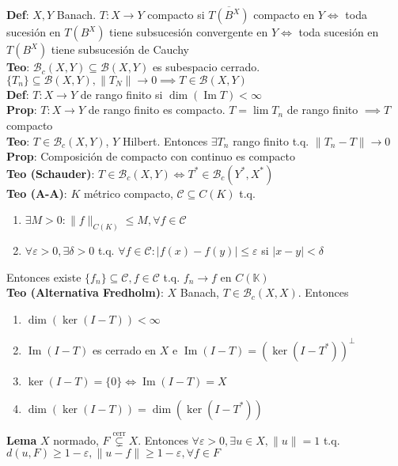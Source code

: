 \documentclass[9pt]{extarticle}
\newcommand{\K}{\mathbb{K}}
\begin{document}
\begin{multicols*}{2}
\begin{enumerate}
\end{enumerate}
\textbf{Def}: $X,Y$ Banach. $T:X\to Y$ compacto si $\overline{T(B^X)}$ compacto en $Y\iff$ toda sucesión en $T(B^X)$ tiene subsucesión convergente en $Y\iff$ toda sucesión en $T(B^X)$ tiene subsucesión de Cauchy\\
\textbf{Teo}: $\mathcal{B}_c(X,Y)\subseteq \mathcal{B}(X,Y)$ es subespacio cerrado. $\{T_n\}\subseteq \mathcal{B}(X,Y), \|T_N\|\to 0\implies T\in\mathcal{B}(X,Y)$\\
\textbf{Def}: $T:X\to Y$ de rango finito si $\operatorname{dim}(\operatorname{Im} T)<\infty$\\
\textbf{Prop}: $T:X\to Y$ de rango finito es compacto. $T=\lim T_n$ de rango finito $\implies T$ compacto\\
\textbf{Teo}: $T\in\mathcal{B}_c(X,Y)$, $Y$ Hilbert. Entonces $\exists T_n$ rango finito t.q. $\|T_n-T\|\to 0$\\
\textbf{Prop}: Composición de compacto con continuo es compacto\\
\textbf{Teo (Schauder)}: $T\in\mathcal{B}_c(X,Y)\iff T^*\in\mathcal{B}_c(Y^*,X^*)$\\
\textbf{Teo (A-A)}: $K$ métrico compacto, $\mathcal{C}\subseteq C(K)$ t.q.\begin{enumerate}
	\item $\exists M>0:\|f\|_{C(K)}\leq M,\forall f\in \mathcal{C}$
	\item $\forall\varepsilon>0,\exists\delta>0$ t.q. $\forall f\in\mathcal{C}:|f(x)-f(y)|\leq \varepsilon$ si $|x-y|<\delta$
\end{enumerate} Entonces existe $\{f_n\}\subseteq \mathcal{C},f\in\mathcal{C}$ t.q. $f_n\to f$ en $C(\K)$\\
\textbf{Teo (Alternativa Fredholm)}: $X$ Banach, $T\in\mathcal{B}_c(X,X)$. Entonces\begin{enumerate}
	\item $\operatorname{dim}(\operatorname{ker}(I-T))<\infty$
	\item $\operatorname{Im}(I-T)$ es cerrado en $X$ e $\operatorname{Im}(I-T)=(\operatorname{ker}(I-T^*))^\perp$
	\item $\operatorname{ker}(I-T)=\{0\}\iff \operatorname{Im}(I-T)=X$
	\item $\operatorname{dim}(\operatorname{ker}(I-T))=\operatorname{dim}(\operatorname{ker}(I-T^*))$
\end{enumerate}
\textbf{Lema} $X$ normado, $F\overset{\text{cerr}}{\subsetneq} X$. Entonces $\forall \varepsilon>0,\exists u\in X,\|u\|=1$ t.q. $d(u,F)\geq 1-\varepsilon, \|u-f\|\geq 1-\varepsilon,\forall f\in F$\\

\end{multicols*}
\end{document}
